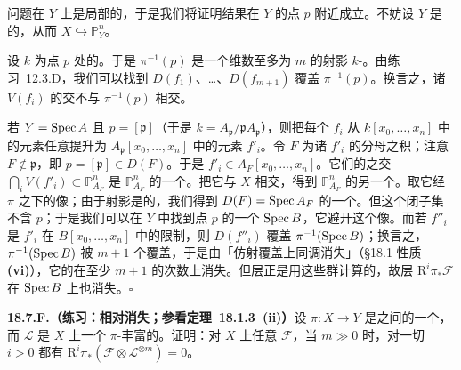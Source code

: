 问题在 $Y$ 上是局部的，于是我们将证明结果在 $Y$ 的点 $p$ 附近成立。不妨设 $Y$ 是\trAffine{}的，从而 $X\hookrightarrow\mathbb{P}^n_Y$。

设 $k$ 为点 $p$ 处的\trResidueField。于是 $\pi^{-1}(p)$ 是一个维数至多为 $m$ 的射影 $k$-\trScheme。由\mbox{练习~12.3.D}，我们可以找到\trAffine\trOpenSet{} $D(f_1)$、\dots{}、$D(f_{m+1})$ 覆盖 $\pi^{-1}(p)$。换言之，诸 $V(f_i)$ 的交不与 $\pi^{-1}(p)$ 相交。

若 $Y=\operatorname{Spec} A$ 且 $p=[\mathfrak{p}]$（于是 $k=A_{\mathfrak{p}}/\mathfrak{p}A_{\mathfrak{p}}$），则把每个 $f_i$ 从 $k[x_0,\dots,x_n]$ 中的元素任意提升为 $A_{\mathfrak{p}}[x_0,\dots,x_n]$ 中的元素 $f'_i$。令 $F$ 为诸 $f'_i$ 的分母之积；注意 $F\notin\mathfrak{p}$，即 $p=[\mathfrak{p}]\in D(F)$。于是 $f'_i\in A_F[x_0,\dots,x_n]$。它们的\trZeroSet{}之交 $\bigcap_i V(f'_i)\subset\mathbb{P}^n_{A_F}$ 是 $\mathbb{P}^n_{A_F}$ 的一个\trClosedSubscheme。把它与 $X$ 相交，得到 $\mathbb{P}^n_{A_F}$ 的另一个\trClosedSubscheme。取它经 $\pi$ 之下的像；由于射影\trMorphism{}是\trClosed{}的，我们得到 $D(F)=\operatorname{Spec} A_F$ 的一个\trClosedSubset。但这个闭子集不含 $p$；于是我们可以在 $Y$ 中找到点 $p$ 的一个\trAffine\trOpen\trNeighborhood{} $\operatorname{Spec} B$，它避开这个像。而若 $f''_i$ 是 $f'_i$ 在 $B[x_0,\dots,x_n]$ 中的限制，则 $D(f''_i)$ 覆盖 $\pi^{-1}(\operatorname{Spec} B)$；换言之，$\pi^{-1}(\operatorname{Spec} B)$ 被 $m+1$ 个\trAffine\trOpenSet{}覆盖，于是由「仿射覆盖上同调消失」（\S18.1 性质 \textbf{(vi)}），它的\trCohomology{}在至少 $m+1$ 的次数上消失。但\trHigherDirectImage{}层正是用这些\trCohomology{}群计算的，故\trHigherPushforward{}层 $\mathrm{R}^i\pi_*\mathscr{F}$ 在 $\operatorname{Spec} B$ 上也消失。\hfill$\square$

\textbf{18.7.F.（练习：相对\trSerre{}消失；参看\mbox{定理~18.1.3}~(ii)）}\quad 设 $\pi\colon X\to Y$ 是\trNoetherian{}\trScheme{}之间的一个\trProper\trMorphism，而 $\mathscr{L}$ 是 $X$ 上一个 $\pi$-丰富的\trInvertibleSheaf。证明：对 $X$ 上任意\trCoherentSheaf{} $\mathscr{F}$，当 $m\gg 0$ 时，对一切 $i>0$ 都有 $\mathrm{R}^i\pi_*(\mathscr{F}\otimes\mathscr{L}^{\otimes m})=0$。
